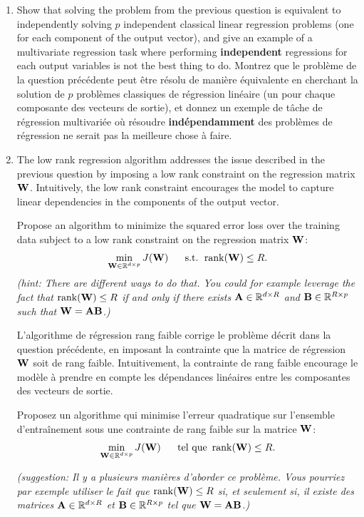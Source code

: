\documentclass[11pt,french,english]{article}
\newcommand{\french}[1]{ {\color{blue} #1} }
\newcommand{\mat}[1]{{\bf #1}}
\newcommand{\W}{\mat{W}}
\newcommand{\A}{\mat{A}}
\newcommand{\B}{\mat{B}}
\newcommand{\R}{\mathbb{R}}
\DeclareMathOperator*{\rank}{rank}
\begin{document}
\begin{enumerate}
{\begin{enumerate}
{%
%
}

\item{  Show that solving the problem from the previous question is equivalent to independently solving $p$ independent classical linear regression problems (one for each component
of the output vector), and give an example of a multivariate regression task where performing \textbf{independent} regressions for each output variables is  not the best thing
to do. \french{Montrez que le problème de la question précédente peut être résolu de manière équivalente en cherchant la solution de $p$ problèmes classiques de régression linéaire (un pour chaque composante des vecteurs de sortie), et donnez un exemple de tâche de régression multivariée où résoudre \textbf{indépendamment} des problèmes de régression ne serait pas la meilleure chose à faire.}}

%
%

%
%

%
%

\item{ The low rank regression algorithm addresses the issue described in the previous question by imposing a low rank constraint on the regression matrix $\W$. Intuitively, the low rank constraint encourages the model to capture linear dependencies in the components of the output vector. 

Propose an algorithm to minimize the squared error loss over the training data subject to a low rank constraint on the regression matrix $\W$:
$$\min_{\W\in\R^{d\times p}} J(\W)\ \ \ \ \ \text{s.t. } \rank(\W)\leq R.$$
\textit{(hint: There are different ways to
do that. You could for example leverage the fact that $\rank(\W) \leq R$ if and only if there exists $\A\in\R^{d\times R}$ and $\B\in \R^{R\times p}$ such that $\W=\A\B$.)}

\french{L'algorithme de régression rang faible corrige le problème décrit dans la question précédente, en imposant la contrainte que la matrice de régression $\W$ soit de rang faible. Intuitivement, la contrainte de rang faible encourage le modèle à prendre en compte les dépendances linéaires entre les composantes des vecteurs de sortie.

Proposez un algorithme qui minimise l'erreur quadratique sur l'ensemble d'entraînement sous une contrainte de rang faible sur la matrice $\W$:
$$\min_{\W\in\R^{d\times p}} J(\W)\ \ \ \ \ \text{tel que } \rank(\W)\leq R.$$

\textit{(suggestion: Il y a plusieurs manières d'aborder ce problème. Vous pourriez par exemple utiliser le fait que $\rank(\W) \leq R$ si, et seulement si, il existe des matrices $\A\in\R^{d\times R}$ et $\B\in \R^{R\times p}$ tel que $\W=\A\B$.)}}}
\end{enumerate}
}


 \end{enumerate}

%
%

%
\end{document}
